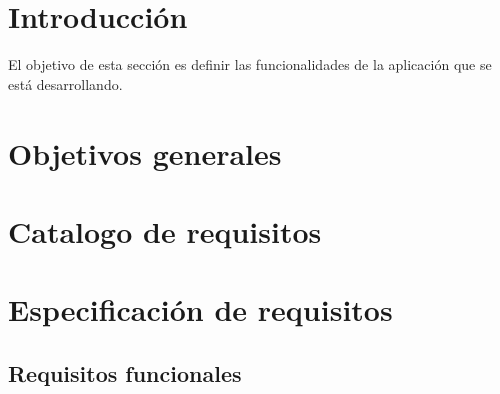 
\section{Introducción}

El objetivo de esta sección es definir las funcionalidades de la aplicación que se está desarrollando.

\section{Objetivos generales}

\section{Catalogo de requisitos}

\section{Especificación de requisitos}

\subsection{Requisitos funcionales}

